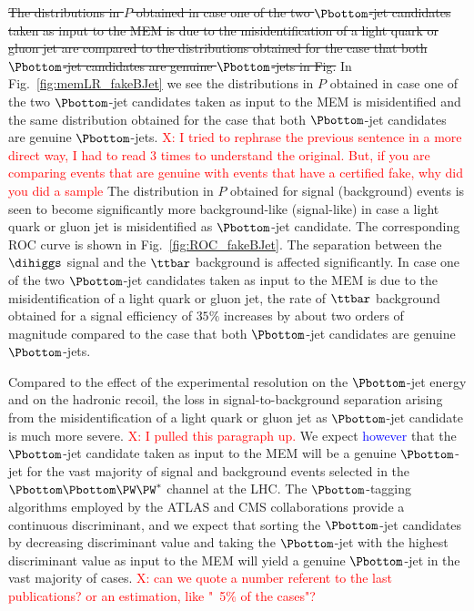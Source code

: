 \st{The distributions in $P$ obtained in case one of the two $\Pbottom$-jet candidates taken as input to the MEM 
is due to the misidentification of a light quark or gluon jet 
are compared to the distributions obtained for the case that both $\Pbottom$-jet candidates are genuine $\Pbottom$-jets in Fig. }
In Fig.~\ref{fig:memLR_fakeBJet} we see the distributions in $P$ obtained in case one of the two $\Pbottom$-jet candidates taken as input to the MEM 
is  misidentified and the same distribution obtained for the case that both $\Pbottom$-jet candidates are genuine $\Pbottom$-jets. 
\textcolor{red}{X: I tried to rephrase the previous sentence in a more direct way, I  had to read 3 times to understand the original. But, if you are comparing events that are genuine with events that have a certified fake, why did you did a sample }
The distribution in $P$ obtained for signal (background) events is seen to become significantly more background-like (signal-like) 
in case a light quark or gluon jet is misidentified as $\Pbottom$-jet candidate.
The corresponding ROC curve is shown in Fig.~\ref{fig:ROC_fakeBJet}.
The separation between the $\dihiggs$ signal and the $\ttbar$ background is affected significantly.
In case one of the two $\Pbottom$-jet candidates taken as input to the MEM is due to the misidentification of a light quark or gluon jet,
the rate of $\ttbar$ background obtained for a signal efficiency of $35\%$ increases by about two orders of magnitude 
compared to the case that both $\Pbottom$-jet candidates are genuine $\Pbottom$-jets.

Compared to the effect of the experimental resolution on the $\Pbottom$-jet energy and on the hadronic recoil,
the loss in signal-to-background separation arising from the misidentification of a light quark or gluon jet as $\Pbottom$-jet candidate
is much more severe. 
\textcolor{red}{X: I pulled this paragraph up.} 
We expect \textcolor{blue}{however} that the $\Pbottom$-jet candidate taken as input to the MEM will be a genuine $\Pbottom$-jet for the vast majority of signal and background events
selected in the $\Pbottom\Pbottom\PW\PW^{*}$ channel at the LHC.
The $\Pbottom$-tagging algorithms employed by the ATLAS and CMS collaborations provide a continuous discriminant, 
and we expect that sorting the $\Pbottom$-jet candidates by decreasing discriminant value and taking the $\Pbottom$-jet with the highest discriminant value as input to the MEM
will yield a genuine $\Pbottom$-jet in the vast majority of cases. \textcolor{red}{X: can we quote a number referent to the last publications? or an estimation, like "~5\% of the cases"?} 


